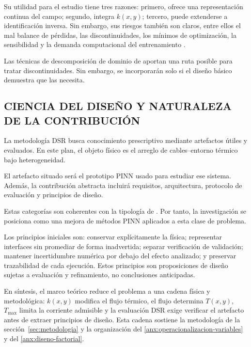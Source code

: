 \documentclass[11pt,a4paper,oneside]{report}
\newcommand{\Tmax}{T_{\max}}
\newcommand{\kx}{k(x,y)}
\begin{document}
Su utilidad para el estudio tiene tres razones: primero, ofrece una representación continua del campo; segundo, integra $\kx$; tercero, puede extenderse a identificación inversa. Sin embargo, sus riesgos también son claros, entre ellos el mal balance de pérdidas, las discontinuidades, los mínimos de optimización, la sensibilidad y la demanda computacional del entrenamiento \parencites[2--6]{ren2025}[16]{pan2025}.

Las técnicas de descomposición de dominio de \textcite[1--2]{shukla2021} aportan una ruta posible para tratar discontinuidades. Sin embargo, se incorporarán solo si el diseño básico demuestra que las necesita.

\subsection{CIENCIA DEL DISEÑO Y NATURALEZA DE LA CONTRIBUCIÓN}
\label{subsec:dsr-contribucion}

La metodología DSR busca conocimiento prescriptivo mediante artefactos útiles y evaluados. En este plan, el objeto físico es el arreglo de cables--entorno térmico bajo heterogeneidad.

El artefacto situado será el prototipo PINN usado para estudiar ese sistema. Además, la contribución abstracta incluirá requisitos, arquitectura, protocolo de evaluación y principios de diseño.

Estas categorías son coherentes con la tipología de \textcite[343--349]{gregor2013}. Por tanto, la investigación se posiciona como una mejora de métodos PINN aplicados a esta clase de problema.

Los principios iniciales son: conservar explícitamente la física; representar interfaces sin promediar de forma inadvertida; separar verificación de validación; mantener incertidumbre numérica por debajo del efecto analizado; y preservar trazabilidad de cada ejecución. Estos principios son proposiciones de diseño sujetas a evaluación y refinamiento, no conclusiones anticipadas.

En síntesis, el marco teórico reduce el problema a una cadena física y metodológica: $\kx$ modifica el flujo térmico, el flujo determina $T(x,y)$, $\Tmax$ limita la corriente admisible y la evaluación DSR exige verificar el artefacto antes de extraer principios de diseño. Esta cadena sostiene la metodología de la sección~\ref{sec:metodologia} y la organización del \ref{anx:operacionalizacion-variables} y del \ref{anx:diseno-factorial}.
\end{document}
